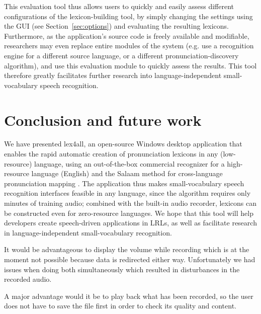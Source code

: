 \documentclass[11pt]{article}
\begin{document}
This evaluation tool thus allows users to quickly and easily assess different configurations of the lexicon-building tool, by simply changing the settings using the GUI (see Section~\ref{sec:options}) and evaluating the resulting lexicons. Furthermore, as the application's source code is freely available and modifiable, researchers may even replace entire modules of the system (e.g. use a recognition engine for a different source language, or a different pronunciation-discovery algorithm), and use this evaluation module to quickly assess the results. This tool therefore greatly facilitates further research into language-independent small-vocabulary speech recognition. 

\section{Conclusion and future work}
\label{sec:future}

We have presented lex4all, an open-source Windows desktop application that enables the rapid automatic creation of pronunciation lexicons in any (low-resource) language, using an out-of-the-box commercial recognizer \cite{mspsdk} for a high-resource language (English) and the Salaam method for cross-language pronunciation mapping \cite{Qiao10,Chan12}. The application thus makes small-vocabulary speech recognition interfaces feasible in any language, since the algorithm requires only minutes of training audio; combined with the built-in audio recorder, lexicons can be constructed even for zero-resource languages. We hope that this tool will help developers create speech-driven applications in LRLs, as well as facilitate research in language-independent small-vocabulary recognition.

It would be advantageous to display the volume while recording which is at the moment not possible because data is redirected either way. Unfortunately we had issues when doing both simultaneously which resulted in disturbances in the recorded audio.

A major advantage would it be to play back what has been recorded, so the user does not have to save the file first in order to check its quality and content.

%

%
%


\end{document}

